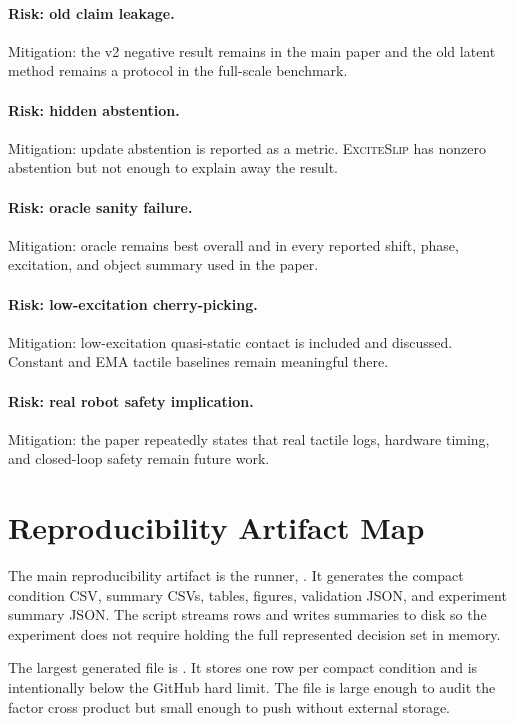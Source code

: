 \documentclass{article}
\newcommand{\method}{\textsc{ExciteSlip}\xspace}
\begin{document}
\paragraph{Risk: old claim leakage.}
Mitigation: the v2 negative result remains in the main paper and the old latent method remains a protocol in the full-scale benchmark.

\paragraph{Risk: hidden abstention.}
Mitigation: update abstention is reported as a metric. \method has nonzero abstention but not enough to explain away the result.

\paragraph{Risk: oracle sanity failure.}
Mitigation: oracle remains best overall and in every reported shift, phase, excitation, and object summary used in the paper.

\paragraph{Risk: low-excitation cherry-picking.}
Mitigation: low-excitation quasi-static contact is included and discussed. Constant and EMA tactile baselines remain meaningful there.

\paragraph{Risk: real robot safety implication.}
Mitigation: the paper repeatedly states that real tactile logs, hardware timing, and closed-loop safety remain future work.

\section{Reproducibility Artifact Map}

The main reproducibility artifact is the runner, . It generates the compact condition CSV, summary CSVs, tables, figures, validation JSON, and experiment summary JSON. The script streams rows and writes summaries to disk so the experiment does not require holding the full represented decision set in memory.

The largest generated file is . It stores one row per compact condition and is intentionally below the GitHub hard limit. The file is large enough to audit the factor cross product but small enough to push without external storage.
\end{document}

